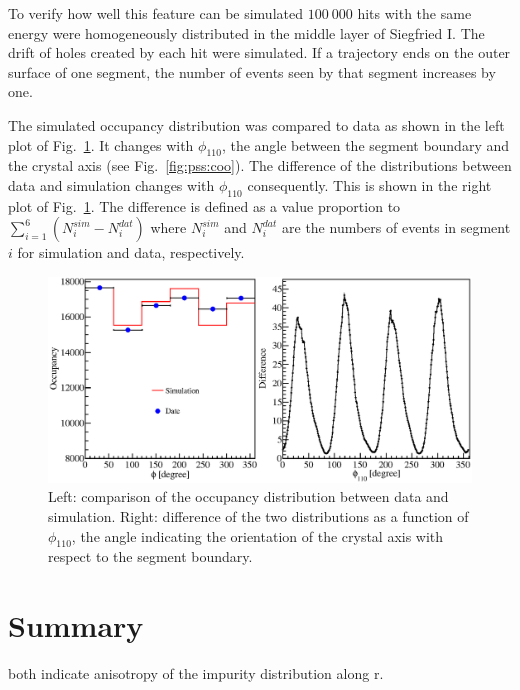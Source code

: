 To verify how well this feature can be simulated $100\ 000$ hits with the same energy were homogeneously distributed in the middle layer of Siegfried I. The drift of holes created by each hit were simulated. If a trajectory ends on the outer surface of one segment, the number of events seen by that segment increases by one. 

The simulated occupancy distribution was compared to data as shown in the left plot of Fig.~\ref{fig:psa:focc}. It changes with $\phi_{110}$, the angle between the segment boundary and the crystal axis (see Fig.~\ref{fig:pss:coo}). The difference of the distributions between data and simulation changes with $\phi_{110}$ consequently. This is shown in the right plot of Fig.~\ref{fig:psa:focc}. The difference is defined as a value proportion to $\sum_{i=1}^{6} (N_{i}^{sim}-N_{i}^{dat})$ where $N_{i}^{sim}$ and $N_{i}^{dat}$ are the numbers of events in segment $i$ for simulation and data, respectively.

\begin{figure}[htbp]
\centering
\includegraphics[width=\textwidth]{fitocc}
\caption{Left: comparison of the occupancy distribution between data and simulation. Right: difference of the two distributions as a function of $\phi_{110}$, the angle indicating the orientation of the crystal axis with respect to the segment boundary.}
\label{fig:psa:focc}
\end{figure}


\section{Summary}
\label{sec:psa:sum}

both indicate anisotropy of the impurity distribution along r.

